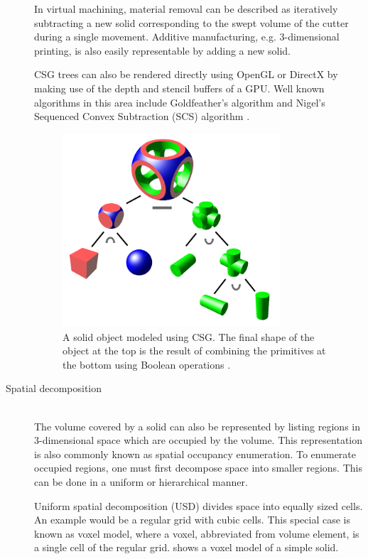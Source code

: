 \begin{description}
	In virtual machining, material removal can be described as iteratively subtracting a new solid corresponding to the swept volume of the cutter during a single movement.
	Additive manufacturing, e.g. 3-dimensional printing, is also easily representable by adding a new solid.

	CSG trees can also be rendered directly using OpenGL or DirectX by making use of the depth and stencil buffers of a GPU.
	Well known algorithms in this area include Goldfeather's algorithm \cite{goldfeather} and Nigel's Sequenced Convex Subtraction (SCS) algorithm \cite{scs}.

	\begin{figure}[H]
		\centering
		\includegraphics[width=0.8\textwidth]{images/csg_tree}
		\caption[CSG tree]{
			A solid object modeled using CSG.
			The final shape of the object at the top is the result of combining the primitives at the bottom using Boolean operations \cite{csg_tree}.
		}
		\label{fig:csg_tree}
	\end{figure}

	\item[Spatial decomposition] \hfill \\
	The volume covered by a solid can also be represented by listing regions in 3-dimensional space which are occupied by the volume.
	This representation is also commonly known as spatial occupancy enumeration.
	To enumerate occupied regions, one must first decompose space into smaller regions.
	This can be done in a uniform or hierarchical manner.

	Uniform spatial decomposition (USD) divides space into equally sized cells.
	An example would be a regular grid with cubic cells.
	This special case is known as voxel model, where a voxel, abbreviated from volume element, is a single cell of the regular grid.
	 shows a voxel model of a simple solid.


\end{description}
